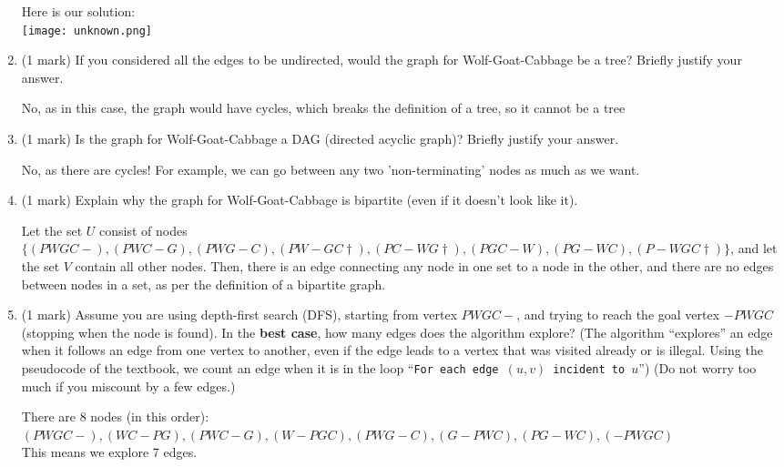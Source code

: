 \documentclass[11pt]{article}
\begin{document}
\begin{enumerate}
\begin{soln}
Here is our solution:\\
\texttt{[image: unknown.png]}
\end{soln}

\item (1 mark)
If you considered all the edges to be undirected, would the graph for
Wolf-Goat-Cabbage be a tree?  Briefly justify your answer.

\begin{soln}
No, as in this case, the graph would have cycles, which breaks the definition of a tree, so it cannot be a tree
\end{soln}

\item (1 mark)
Is the graph for Wolf-Goat-Cabbage a DAG (directed acyclic graph)?
Briefly justify your answer.

\begin{soln}
No, as there are cycles! For example, we can go between any two 'non-terminating' nodes as much as we want.
\end{soln}

\item (1 mark)
Explain why the graph for Wolf-Goat-Cabbage is bipartite (even if
it doesn't look like it).

\begin{soln}
Let the set $U$ consist of nodes $\{(PWGC-), (PWC-G), (PWG-C), (PW-GC\dagger), (PC-WG\dagger), (PGC-W), (PG-WC), (P-WGC\dagger)\}$, and let the set $V$ contain all other nodes. Then, there is an edge connecting any node in one set to a node in the other, and there are no edges between nodes in a set, as per the definition of a bipartite graph.
\end{soln}

\item (1 mark)
Assume you are using depth-first search (DFS),
starting from vertex $PWGC-$,
and trying to reach the goal vertex $-PWGC$ (stopping when the node is found).
In the \textbf{best case},
how many edges does the algorithm explore?
(The algorithm ``explores'' an edge when it follows an edge from
one vertex to another, even if the edge leads to a vertex that
was visited already or is illegal.
Using the pseudocode of the textbook, we count an edge when it
is in the loop ``\texttt{For each edge $(u,v)$ incident to $u$}'')
(Do not worry too much if you miscount by a few edges.)

\begin{soln}
There are 8 nodes (in this order):\\ $(PWGC-),(WC-PG),(PWC-G),(W-PGC),(PWG-C),(G-PWC),(PG-WC),(-PWGC)$\\
This means we explore 7 edges.
\end{soln}


\end{enumerate}
\end{document}
